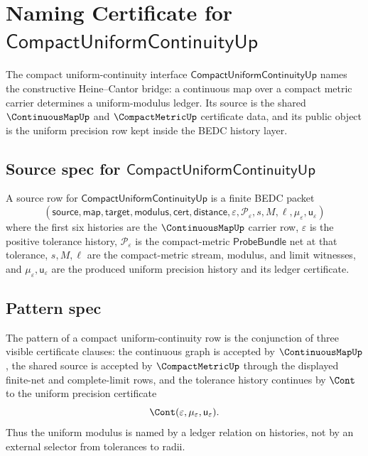 \chapter{Naming Certificate for $\mathsf{CompactUniformContinuityUp}$}
\label{ch:concrete-instances-compact-uniform-continuity}

The compact uniform-continuity interface $\mathsf{CompactUniformContinuityUp}$ names the constructive Heine--Cantor bridge: a continuous map over a compact metric carrier determines a uniform-modulus ledger. Its source is the shared $\ContinuousMapUp$ and $\CompactMetricUp$ certificate data, and its public object is the uniform precision row kept inside the BEDC history layer.

\section{Source spec for $\mathsf{CompactUniformContinuityUp}$}
\label{sec:concrete-instances-compact-uniform-continuity-source-spec}

\begin{definition}
\label{def:concrete-instances-compact-uniform-continuity-source-rows}
A source row for $\mathsf{CompactUniformContinuityUp}$ is a finite BEDC packet
$$
(\mathsf{source},\mathsf{map},\mathsf{target},\mathsf{modulus},\mathsf{cert},
\mathsf{distance},\varepsilon,\mathcal{P}_{\varepsilon},s,M,\ell,
\mu_{\varepsilon},\mathsf{u}_{\varepsilon})
$$
where the first six histories are the $\ContinuousMapUp$ carrier row, $\varepsilon$ is the positive tolerance history, $\mathcal{P}_{\varepsilon}$ is the compact-metric $\mathsf{ProbeBundle}$ net at that tolerance, $s,M,\ell$ are the compact-metric stream, modulus, and limit witnesses, and $\mu_{\varepsilon},\mathsf{u}_{\varepsilon}$ are the produced uniform precision history and its ledger certificate.
\end{definition}

\section{Pattern spec}
\label{sec:concrete-instances-compact-uniform-continuity-pattern}

\begin{definition}
\label{def:concrete-instances-compact-uniform-continuity-pattern}
The pattern of a compact uniform-continuity row is the conjunction of three visible certificate clauses: the continuous graph is accepted by $\ContinuousMapUp$, the shared source is accepted by $\CompactMetricUp$ through the displayed finite-net and complete-limit rows, and the tolerance history continues by $\Cont$ to the uniform precision certificate
$$
\Cont(\varepsilon,\mu_{\varepsilon},\mathsf{u}_{\varepsilon}).
$$
Thus the uniform modulus is named by a ledger relation on histories, not by an external selector from tolerances to radii.
\end{definition}

